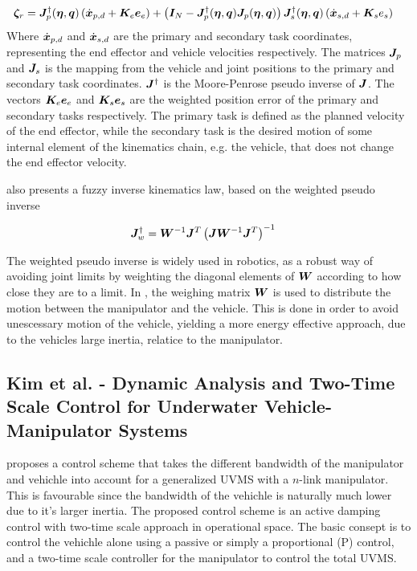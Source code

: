 \begin{align}
\label{eq:antIK}
\boldsymbol \zeta_r &=\boldsymbol J_{p}^{\dagger}(\boldsymbol \eta,\boldsymbol q) \left( \dot{\boldsymbol x}_{p,d} + \boldsymbol K_{e} \boldsymbol e_{e} \right) + \left( \boldsymbol I_N - \boldsymbol J_{p}^\dagger(\boldsymbol \eta,\boldsymbol q) \boldsymbol J_{p}(\boldsymbol \eta,\boldsymbol q)  \right)\boldsymbol J_{s}^\dagger(\boldsymbol \eta,\boldsymbol q) \left(\dot{\boldsymbol x}_{s,d} + \boldsymbol K_{s}e_{s} \right)
\end{align}
Where $ \dot{\boldsymbol x}_{p,d}$ and  $ \dot{\boldsymbol x}_{s,d}$ are the primary and secondary task coordinates, representing the end effector and vehicle velocities respectively. The matrices $\boldsymbol J_p$ and $ \boldsymbol J_s $ is the mapping from the vehicle and joint positions to the primary and secondary task coordinates. $\boldsymbol J^{\dagger}$ is the Moore-Penrose pseudo inverse of $\boldsymbol J$. The vectors $\boldsymbol K_{e}\boldsymbol e_{e}$ and $ \boldsymbol K_{s}\boldsymbol e_{s}$ are the weighted  position error of the primary and secondary tasks respectively.
The primary task is defined as the planned velocity of the end effector, while the secondary task is the desired motion of some internal element of the kinematics chain, e.g. the vehicle, that does not change the end effector velocity.

\cite{antonelli1} also presents a fuzzy inverse kinematics law, based on the weighted pseudo inverse

\begin{align}
	\boldsymbol J_{w}^{\dagger} &= \boldsymbol W^{-1} \boldsymbol J^{T} \left( \boldsymbol J \boldsymbol W^{-1}\boldsymbol J^{T} \right)^{-1}
	\label{eq:wpseudo}
\end{align}

The weighted pseudo inverse is widely used in robotics, as a robust way of avoiding joint limits by weighting the diagonal elements of $\boldsymbol W$ according to how close they are to a limit. In \cite{antonelli1}, the weighing matrix $\boldsymbol W$ is used to distribute the motion between the manipulator and the vehicle. This is done in order to avoid unescessary motion of the vehicle, yielding a more energy effective approach, due to the vehicles large inertia, relatice to the manipulator.


\subsection{Kim et al. -  Dynamic Analysis and Two-Time Scale Control for
Underwater Vehicle-Manipulator Systems}

\cite{two_time_scale} proposes a control scheme that takes the different bandwidth of the manipulator and vehichle into account for a generalized UVMS with a $n$-link manipulator. This is favourable since the bandwidth of the vehichle is naturally much lower due to it's larger inertia. The proposed control scheme is an active damping control with two-time scale approach in operational space. The basic consept is to control the vehichle alone using a passive or simply a proportional (P) control, and a two-time scale controller for the manipulator to control the total UVMS. 

